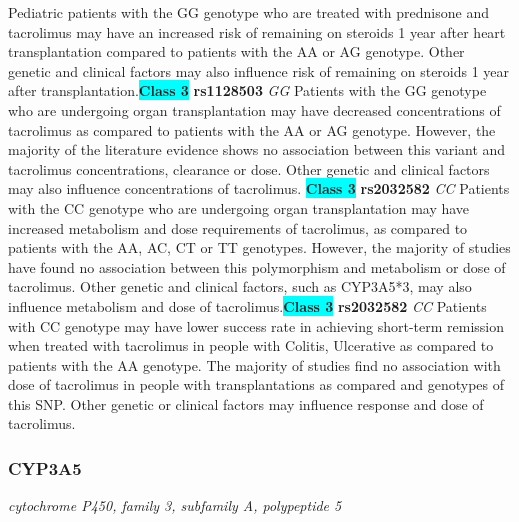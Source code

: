 \documentclass{report}
\begin{document}
Pediatric patients with the GG genotype who are treated with prednisone and tacrolimus may have an increased risk of remaining on steroids 1 year after heart transplantation compared to patients with the AA or AG genotype. Other genetic and clinical factors may also influence risk of remaining on steroids 1 year after transplantation.\newline\textbf{\colorbox{cyan} {Class 3}} \textbf{ rs1128503 } \textit{ GG }
Patients with the GG genotype who are undergoing organ transplantation may have decreased concentrations of tacrolimus as compared to patients with the AA or AG genotype. However, the majority of the literature evidence shows no association between this variant and tacrolimus concentrations, clearance or dose. Other genetic and clinical factors may also influence concentrations of tacrolimus. \newline\textbf{\colorbox{cyan} {Class 3}} \textbf{ rs2032582 } \textit{ CC }
Patients with the CC genotype who are undergoing organ transplantation may have increased metabolism and dose requirements of tacrolimus, as compared to patients with the AA, AC, CT or TT genotypes. However, the majority of studies have found no association between this polymorphism and metabolism or dose of tacrolimus. Other genetic and clinical factors, such as CYP3A5*3, may also influence metabolism and dose of tacrolimus.\newline\textbf{\colorbox{cyan} {Class 3}} \textbf{ rs2032582 } \textit{ CC }
Patients with CC genotype may have lower success rate in achieving short-term remission when treated with tacrolimus in people with Colitis, Ulcerative as compared to patients with the AA genotype. The majority of studies find no association with dose of tacrolimus in people with transplantations as compared and genotypes of this SNP. Other genetic or clinical factors may influence response and dose of tacrolimus.\newline\subsubsection{ CYP3A5 }
\textit{ cytochrome P450, family 3, subfamily A, polypeptide 5 }
\end{document}
